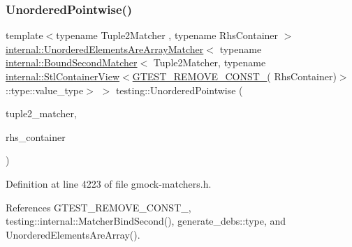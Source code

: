\subsubsection{\texorpdfstring{Unordered\+Pointwise()}{UnorderedPointwise()}}
{\footnotesize\ttfamily template$<$typename Tuple2\+Matcher , typename Rhs\+Container $>$ \\
\hyperlink{classtesting_1_1internal_1_1UnorderedElementsAreArrayMatcher}{internal\+::\+Unordered\+Elements\+Are\+Array\+Matcher}$<$ typename \hyperlink{classtesting_1_1internal_1_1BoundSecondMatcher}{internal\+::\+Bound\+Second\+Matcher}$<$ Tuple2\+Matcher, typename \hyperlink{classtesting_1_1internal_1_1StlContainerView}{internal\+::\+Stl\+Container\+View}$<$\hyperlink{gtest-internal_8h_a2ffec8c60510eb130af387f5ce9a756a}{G\+T\+E\+S\+T\+\_\+\+R\+E\+M\+O\+V\+E\+\_\+\+C\+O\+N\+S\+T\+\_\+}( Rhs\+Container)$>$\+::type\+::value\+\_\+type$>$ $>$ testing\+::\+Unordered\+Pointwise (\begin{DoxyParamCaption}\item[{const Tuple2\+Matcher \&}]{tuple2\+\_\+matcher,  }\item[{const Rhs\+Container \&}]{rhs\+\_\+container }\end{DoxyParamCaption})\hspace{0.3cm}{\ttfamily [inline]}}



Definition at line 4223 of file gmock-\/matchers.\+h.



References G\+T\+E\+S\+T\+\_\+\+R\+E\+M\+O\+V\+E\+\_\+\+C\+O\+N\+S\+T\+\_\+, testing\+::internal\+::\+Matcher\+Bind\+Second(), generate\+\_\+debs\+::type, and Unordered\+Elements\+Are\+Array().


